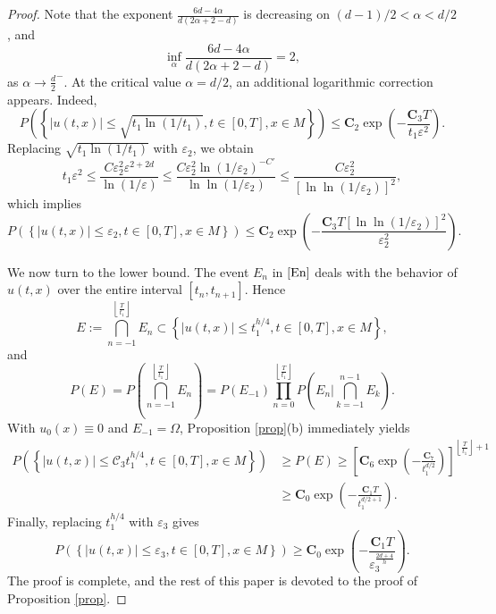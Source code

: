 \documentclass[10pt,a4paper]{amsart}
\begin{document}
\begin{proof}
Note that the exponent $\frac{6d-4\alpha}{d(2\alpha+2-d)}$ is decreasing on $(d-1)/2<\alpha< d/2$, and
\begin{equation*}
    \inf_{\alpha}\frac{6d-4\alpha}{d(2\alpha+2-d)}=2,
\end{equation*}
as $\alpha\to \frac{d}{2}^-$. At the critical value $\alpha=d/2$, an additional logarithmic correction appears. Indeed,
\begin{equation*}
    P\left(\left\lbrace\vert u(t,x)\vert\leq \sqrt{t_1\ln(1/t_1)}, t\in[0,T],x\in M\right\rbrace\right)\leq\textbf{C}_2\exp\left(-\frac{\textbf{C}_3T}{t_1\varepsilon^2}\right).
\end{equation*}
Replacing $\sqrt{t_1\ln(1/t_1)}$ with $\varepsilon_2$, we obtain
\begin{equation*}
    t_1\varepsilon^2\leq\frac{C\varepsilon_2^2\varepsilon^{2+2d}}{\ln(1/\varepsilon)}\leq\frac{C\varepsilon_2^2\ln(1/\varepsilon_2)^{-C'}}{\ln\ln(1/\varepsilon_2)}\leq\frac{C\varepsilon_2^2}{[\ln\ln(1/\varepsilon_2)]^{2}},
\end{equation*}
which implies
\begin{equation*}
    P\left(\left\lbrace\vert u(t,x)\vert\leq \varepsilon_2, t\in[0,T],x\in M\right\rbrace\right)\leq\textbf{C}_2\exp\left(-\frac{\textbf{C}_3T[\ln\ln(1/\varepsilon_2)]^2}{\varepsilon_2^{2}}\right).
\end{equation*}

We now turn to the lower bound. The event $E_{n}$ in $\eqref{En}$ deals with the behavior of $u(t,x)$ over the entire interval $[t_n,t_{n+1}]$. Hence
\[E:=\bigcap_{n=-1}^{\left\lfloor\frac{T}{t_1}\right\rfloor}E_{n}\subset \left\lbrace\vert u(t,x)\vert\leq t_1^{h/4}, t\in[0,T],x\in M\right\rbrace,\]
and
\[P(E)=P\left(\bigcap_{n=-1}^{\left\lfloor\frac{T}{t_1}\right\rfloor}E_{n}\right)=P(E_{-1})\prod_{n=0}^{\left\lfloor\frac{T}{t_1}\right\rfloor}P\left(E_{n}\bigg| \bigcap_{k=-1}^{n-1}E_{k}\right).\]
With $u_0(x)\equiv 0$ and $E_{-1}=\Omega$, Proposition \ref{prop}(b) immediately yields
\begin{equation*}
    \begin{split}
        P\left(\left\lbrace\vert u(t,x)\vert\leq \mathcal{C}_3t_1^{h/4}, t\in[0,T],x\in M\right\rbrace\right)&\geq P(E)\geq \left[\textbf{C}_6\exp\left(-\frac{\textbf{C}_7}{t_1^{d/2}}\right)\right]^{\left\lfloor\frac{T}{t_1}\right\rfloor+1}\\
        &\geq \textbf{C}_0\exp\left(-\frac{\textbf{C}_1T}{t_1^{d/2+1}}\right).
    \end{split}
\end{equation*}
Finally, replacing $t_1^{h/4}$ with $\varepsilon_3$ gives
\begin{equation*}
P\left(\left\lbrace\vert u(t,x)\vert\leq \varepsilon_3, t\in[0,T],x\in M\right\rbrace\right)\geq\textbf{C}_0\exp\left(-\frac{\textbf{C}_1T}{\varepsilon_3^{\frac{2d+4}{h}}}\right).
\end{equation*}
The proof is complete, and the rest of this paper is devoted to the proof of Proposition \ref{prop}.
\end{proof}
\end{document}
